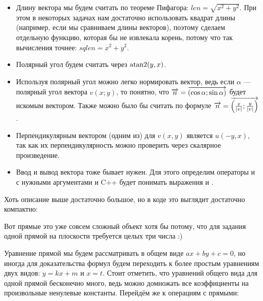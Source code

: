 \begin{itemize}
    \item Длину вектора мы будем считать по теореме Пифагора: $len = \sqrt{x^2 + y^2}$. При этом в некоторых задачах нам достаточно использовать квадрат длины (например, если мы сравниваем длины векторов), поэтому сделаем отдельную функцию, которая бы не извлекала корень, потому что так вычисления точнее: $sqlen = x^2 + y^2$.
    \item Полярный угол будем считать через $\operatorname{atan2}(y, x)$.
    \item Используя полярный угол можно легко нормировать вектор, ведь если $\alpha$ — полярный угол вектора $v(x; y)$, то понятно, что $\overrightarrow{n} = \overrightarrow{(\cos \alpha; \sin \alpha)}$ будет искомым вектором. Также можно было бы считать по формуле $\overrightarrow{n} = \overrightarrow{\left(\frac{x}{|v|}; \frac{y}{|v|}\right)}$.
    \item Перпендикулярным вектором (одним из) для $v(x, y)$ является $u(-y, x)$, так как их перпендикулярность можно проверить через скалярное произведение.
    \item Ввод и вывод вектора тоже бывает нужен. Для этого определим операторы \lcpp{>>} и \lcpp{<<} с нужными аргументами и C++ будет понимать выражения  и .
\end{itemize}

Хоть описание выше достаточно большое, но в коде это выглядит достаточно компактно:



Вот прямые это уже совсем сложный объект хотя бы потому, что для задания одной прямой на плоскости требуется целых три числа :)

Уравнение прямой мы будем рассматривать в общем виде $a x + b y + c = 0$, но иногда для доказательства формул будем переходить к более простым уравнениям двух видов: $y = k x + m$ и $x = t$. Стоит отметить, что уравнений общего вида для одной прямой бесконечно много, ведь можно домножать все коэффициенты на произвольные ненулевые константы. Перейдём же к операциям с прямыми:

